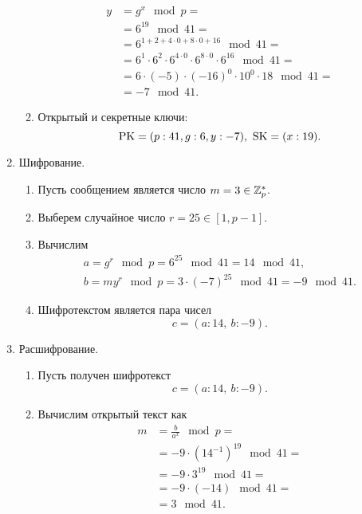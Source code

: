 \begin{enumerate}
\begin{enumerate}
\[\begin{array}{ll}
                    y & = g^x \mod p = \\
                    & = 6^{19} \mod 41 = \\
                    & = 6^{1 + 2 + 4 \cdot 0 + 8 \cdot 0 + 16} \mod 41 = \\
                    & = 6^1 \cdot 6^2 \cdot 6^{4 \cdot 0} \cdot 6^{8 \cdot 0} \cdot 6^{16} \mod 41 = \\
                    & = 6 \cdot (-5) \cdot (-16)^0 \cdot 10^0 \cdot 18 \mod 41 = \\
                    & = -7 \mod 41.
                \end{array} \]
            \item Открытый и секретные ключи:
                \[ \textrm{PK} = (p:41, g:6, y:-7), ~ \textrm{SK} = (x:19). \]
        \end{enumerate}
    \item Шифрование.
        \begin{enumerate}
            \item Пусть сообщением является число $m = 3 \in \mathbb{Z}_p^*$.
            \item Выберем случайное число $r = 25 \in [1, p-1]$.
            \item Вычислим
                \[ \begin{array}{l}
                    a = g^r \mod p = 6^{25} \mod 41 = 14 \mod 41, \\
                    b = m y^r \mod p = 3 \cdot (-7)^{25} \mod 41 = -9 \mod 41.
                \end{array} \]
            \item Шифротекстом является пара чисел
                \[ c = (a:14, ~ b:-9). \]
        \end{enumerate}
    \item Расшифрование.
        \begin{enumerate}
            \item Пусть получен шифротекст
                \[ c = (a:14, ~ b:-9). \]
            \item Вычислим открытый текст как
                \[ \begin{array}{ll}
                    m & = \frac{b}{a^x} \mod p = \\
                    & = -9 \cdot (14^{-1})^{19} \mod 41 = \\
                    & = -9 \cdot 3^{19} \mod 41 = \\
                    & = -9 \cdot (-14) \mod 41 = \\
                    & = 3 \mod 41. \\
                \end{array} \]
        \end{enumerate}
\end{enumerate}


